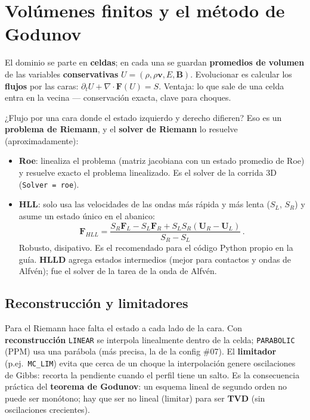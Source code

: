 \documentclass[11pt,a4paper]{article}
\newcommand{\B}{\mathbf{B}}
\newcommand{\vct}{\mathbf{v}}
\newcommand{\dif}{\partial_t}
\newcommand{\code}[1]{\texttt{#1}}
\newcommand{\term}[1]{\textbf{#1}}
\begin{document}
\section{Volúmenes finitos y el método de Godunov}

El dominio se parte en \term{celdas}; en cada una se guardan \term{promedios de volumen}
de las variables \term{conservativas} $U=(\rho,\rho\vct,E,\B)$. Evolucionar es calcular
los \term{flujos} por las caras: $\dif{U} + \nabla\cdot\mathbf{F}(U)=S$. Ventaja: lo que
sale de una celda entra en la vecina --- conservación exacta, clave para choques.

¿Flujo por una cara donde el estado izquierdo y derecho difieren? Eso es un
\term{problema de Riemann}, y el \term{solver de Riemann} lo resuelve (aproximadamente):
\begin{itemize}[nosep]
  \item \term{Roe}: linealiza el problema (matriz jacobiana con un estado promedio de
  Roe) y resuelve exacto el problema linealizado. Es el solver de la corrida 3D
  (\code{Solver = roe}).
  \item \term{HLL}: solo usa las velocidades de las ondas más rápida y más lenta
  ($S_L$, $S_R$) y asume un estado único en el abanico:
  \begin{equation}
  \mathbf{F}_{HLL}=\frac{S_R\mathbf{F}_L-S_L\mathbf{F}_R+S_LS_R(\mathbf{U}_R-\mathbf{U}_L)}{S_R-S_L}\,.
  \end{equation}
  Robusto, disipativo. Es el recomendado para el código Python propio en la guía.
  \term{HLLD} agrega estados intermedios (mejor para contactos y ondas de Alfvén); fue
  el solver de la tarea de la onda de Alfvén.
\end{itemize}

\subsection{Reconstrucción y limitadores}

Para el Riemann hace falta el estado a cada lado de la cara. Con \term{reconstrucción}
\code{LINEAR} se interpola linealmente dentro de la celda; \code{PARABOLIC} (PPM) usa una
parábola (más precisa, la de la config \#07). El \term{limitador} (p.ej.\ \code{MC\_LIM})
evita que cerca de un choque la interpolación genere oscilaciones de Gibbs: recorta la
pendiente cuando el perfil tiene un salto. Es la consecuencia práctica del
\term{teorema de Godunov}: un esquema lineal de segundo orden no puede ser
monótono; hay que ser no lineal (limitar) para ser \term{TVD} (sin oscilaciones crecientes).
\end{document}
